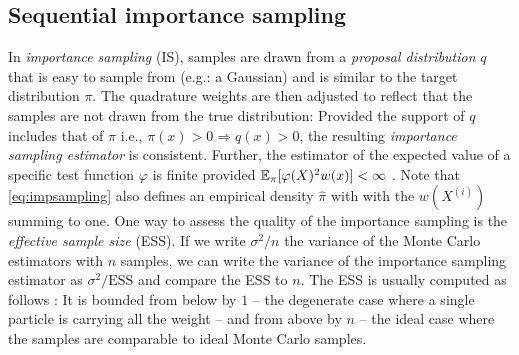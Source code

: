 \subsection{Sequential importance sampling}
In \emph{importance sampling} (IS), samples are drawn from a \emph{proposal distribution} $q$ that is easy to sample from (e.g.: a Gaussian) and is similar to the target distribution $\pi$. 
The quadrature weights are then adjusted to reflect that the samples are not drawn from the true distribution:
%
%
Provided the support of $q$ includes that of $\pi$ i.e., $\pi(x)>0\Rightarrow q(x)>0$, the resulting \emph{importance sampling estimator} is consistent. Further, the estimator of the expected value of a specific test function $\varphi$ is finite provided $\mathbb E_{\pi}[\varphi(X)^{2}w(x)]<\infty$ \citep[chapter 3.3]{robert04}. Note that \eqref{eq:impsampling} also defines an empirical density $\hat\pi$ with 
%
%
with the $w(X^{(i)})$ summing to one. One way to assess the quality of the importance sampling is the \emph{effective sample size} (ESS)\addref. If we write $\sigma^{2}/n$ the variance of the Monte Carlo estimators with $n$ samples, we can write the variance of the importance sampling estimator as $\sigma^{2}/\text{ESS}$ and compare the ESS to $n$. The ESS is usually computed as follows \citep{kong94}:
%
%
It is bounded from below by $1$ -- the degenerate case where a single particle is carrying all the weight -- and from above by $n$ -- the ideal case where the samples are comparable to ideal Monte Carlo samples.


